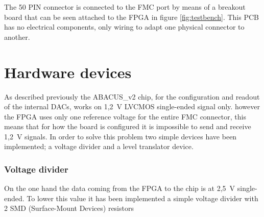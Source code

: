 \noindent The 50 PIN connector is connected to the FMC port by means of a breakout board that can be seen attached to the FPGA in figure \ref{fig:testbench}. This PCB has no electrical components, only wiring to adapt one physical connector to another.
\section{Hardware devices}\label{hardware}
\noindent As described previously the ABACUS\_v2 chip, for the configuration and readout of the internal DACs, works on 1,2~V LVCMOS single-ended signal only. however the FPGA uses only one reference voltage for the entire FMC connector, this means that for how the board is configured it is impossible to send and receive 1,2~V signals.
In order to solve this problem two simple devices have been implemented; a voltage divider and a level translator device.
\subsubsection{Voltage divider}
On the one hand the data coming from the FPGA to the chip is at 2,5~V single-ended. To lower this value it has been implemented a simple voltage divider with 2 SMD (Surface-Mount Devices) resistors
